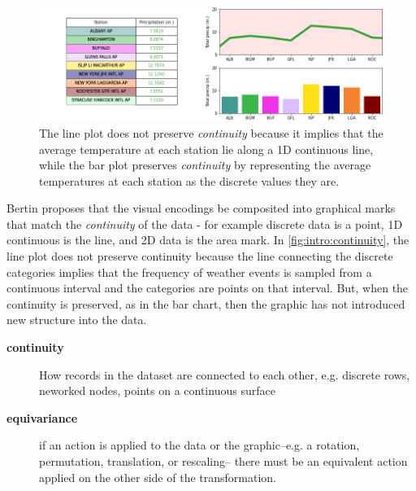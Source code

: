 \documentclass[../main.tex]{subfiles}
\begin{document}
\begin{figure}[H]
    \includegraphics[width=1\textwidth]{figures/intro/continuity.png}
    \caption{The line plot does not preserve \textit{continuity} because it implies that the average temperature at each station lie along a 1D continuous line, while the bar plot preserves \textit{continuity} by representing the average temperatures at each station as the discrete values they are.}
    \label{fig:intro:continuity}
\end{figure}
Bertin proposes that the visual encodings be composited into graphical marks that match the \textit{continuity} of the data - for example discrete data is a point, 1D continuous is the line, and 2D data is the area mark. In \autoref{fig:intro:continuity}, the line plot does not preserve continuity because the line connecting the discrete categories implies that the frequency of weather events is sampled from a continuous interval and the categories are points on that interval. But, when the continuity is preserved, as in the bar chart, then the graphic has not introduced new structure into the data. 

\begin{mdframed}[roundcorner=10pt, frametitle=Structure, frametitlerule=true, frametitlebackgroundcolor=gray!10]
    \begin{description}
        \item[\textbf{continuity}] How records in the dataset are connected to each other, e.g. discrete rows, neworked nodes, points on a continuous surface
        \item[\textbf{equivariance}] if an action is applied to the data or the graphic--e.g. a rotation, permutation, translation, or rescaling-- there must be an equivalent action applied on the other side of the transformation. 
    \end{description}
\end{mdframed}
\end{document}
